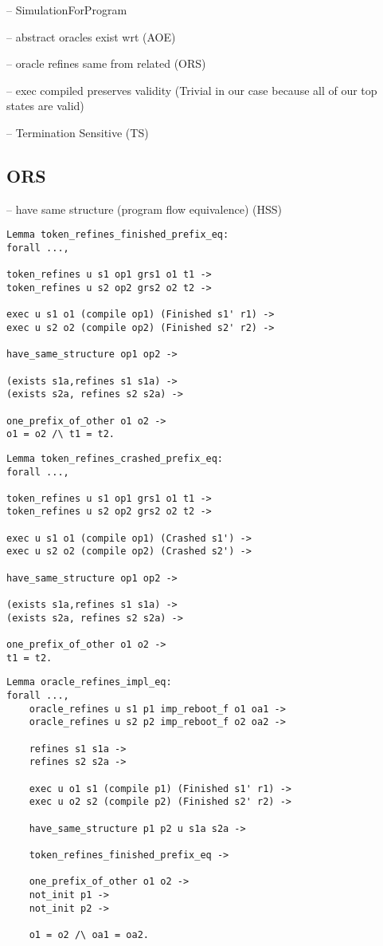 -- SimulationForProgram
    
-- abstract oracles exist wrt (AOE)

-- oracle refines same from related (ORS)

-- exec compiled preserves validity (Trivial in our case because all of our top states are valid)

-- Termination Sensitive (TS)

\subsection{ORS}
-- have same structure (program flow equivalence) (HSS)

\begin{verbatim}
Lemma token_refines_finished_prefix_eq:
forall ...,

token_refines u s1 op1 grs1 o1 t1 ->
token_refines u s2 op2 grs2 o2 t2 ->

exec u s1 o1 (compile op1) (Finished s1' r1) ->
exec u s2 o2 (compile op2) (Finished s2' r2) ->

have_same_structure op1 op2 -> 

(exists s1a,refines s1 s1a) ->
(exists s2a, refines s2 s2a) ->

one_prefix_of_other o1 o2 ->
o1 = o2 /\ t1 = t2.
\end{verbatim}

\begin{verbatim}
Lemma token_refines_crashed_prefix_eq:
forall ...,

token_refines u s1 op1 grs1 o1 t1 ->
token_refines u s2 op2 grs2 o2 t2 ->

exec u s1 o1 (compile op1) (Crashed s1') ->
exec u s2 o2 (compile op2) (Crashed s2') ->

have_same_structure op1 op2 -> 

(exists s1a,refines s1 s1a) ->
(exists s2a, refines s2 s2a) ->

one_prefix_of_other o1 o2 ->
t1 = t2.
\end{verbatim}

\begin{verbatim}
Lemma oracle_refines_impl_eq:
forall ...,
    oracle_refines u s1 p1 imp_reboot_f o1 oa1 ->
    oracle_refines u s2 p2 imp_reboot_f o2 oa2 ->
    
    refines s1 s1a ->
    refines s2 s2a ->
    
    exec u o1 s1 (compile p1) (Finished s1' r1) ->
    exec u o2 s2 (compile p2) (Finished s2' r2) ->
    
    have_same_structure p1 p2 u s1a s2a ->
    
    token_refines_finished_prefix_eq ->
    
    one_prefix_of_other o1 o2 ->
    not_init p1 ->
    not_init p2 ->
    
    o1 = o2 /\ oa1 = oa2.
\end{verbatim}

